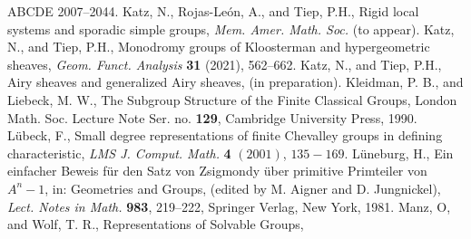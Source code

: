 \documentclass[11pt]{amsart}
\theoremstyle{plain}
\theoremstyle{definition}
\numberwithin{thm}{section}
\numberwithin{equation}{thm}
\newcommand{\A}{{\mathbb A}}
\newcommand{\0}{\emptyset}
\begin{document}
\begin{thebibliography}{ABCDE}
2007--2044.
\medskip
{}Katz, N., Rojas-Le\'{o}n, A., and Tiep, P.H., Rigid local systems and sporadic simple groups, {\it Mem. Amer. 
Math. Soc.} (to appear).
\medskip
{}
Katz, N., and Tiep, P.H., Monodromy groups of Kloosterman and hypergeometric sheaves, {\it Geom. Funct. Analysis} {\bf 31} (2021), 562--662.
\medskip
{}
Katz, N., and Tiep, P.H., Airy sheaves and generalized Airy sheaves, (in preparation).
\medskip
{}
  Kleidman, P. B., and Liebeck, M. W., {The Subgroup Structure of the
Finite Classical Groups}, London Math. Soc. Lecture Note Ser. no.
{\bf 129}, Cambridge University Press, 1990.
\medskip
{}
  L\"ubeck, F., Small degree representations of finite Chevalley groups in defining
characteristic, {\it LMS J. Comput. Math.} {\bf 4} $(2001)$, $135 - 169$.
\medskip
{}
  L\"uneburg, H., Ein einfacher Beweis f\"ur den Satz von Zsigmondy \"uber primitive Primteiler von $A^n-1$, in: Geometries and Groups, (edited by M. Aigner and D. Jungnickel), {\it Lect. Notes in Math.} {\bf 983}, 219--222, Springer Verlag, New York, 1981. 
\medskip
 Manz, O, and  Wolf, T. R.,  Representations of Solvable Groups,

\end{thebibliography}
\end{document}
